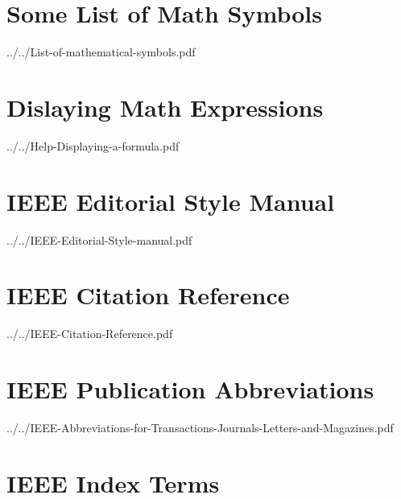 	\chapter{Some List of Math Symbols} 
	\label{ch:math_sym}
	
	
	{../../List-of-mathematical-symbols.pdf}
	\cleardoublepage
	
	\chapter{Dislaying Math Expressions} 
	\label{ch:disp_math}
	
	
	{../../Help-Displaying-a-formula.pdf}
	\cleardoublepage
	
	\chapter{IEEE Editorial Style Manual} 
	\label{ch:ieee_edsm}
	
	
	{../../IEEE-Editorial-Style-manual.pdf}
	\cleardoublepage
	
	\chapter{IEEE Citation Reference} 
	\label{ch:ieee_cr}
	
	
	{../../IEEE-Citation-Reference.pdf}
	\cleardoublepage
	
	\chapter{IEEE Publication Abbreviations} 
	\label{ch:ieee_pub_abb}
	
	
	{../../IEEE-Abbreviations-for-Transactions-Journals-Letters-and-Magazines.pdf}
	\cleardoublepage
	
	\chapter{IEEE Index Terms} 
	\label{ch:ieee_keywords}
	
